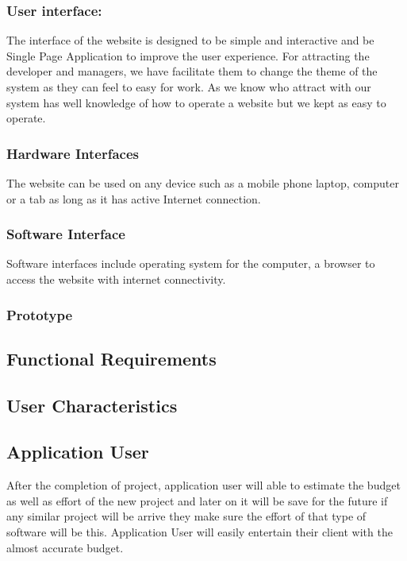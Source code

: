     \subsubsection{User interface: }
    The interface of the website is designed to be simple and interactive and be Single Page Application to improve the user experience. 
    For attracting the developer and managers, we have facilitate them to change the theme of the system as they can feel to easy for work.
    As we know who attract with our system has well knowledge of how to operate a website but we kept as easy to operate.
    \subsubsection{Hardware Interfaces}
    The website can be used on any device such as a mobile phone laptop, computer or a tab as long as it has active Internet connection.
    \subsubsection{Software Interface}
    Software interfaces include operating system for the computer, a browser to access the website with internet connectivity.
    \subsubsection{Prototype}
    
    
    \pagebreak
    \subsection{Functional Requirements}
    

    
    \pagebreak

    


\subsection{User Characteristics}
\subsection*{Application User}
After the completion of project, application user will able to estimate the budget as well as effort of the new project and later on it will be save for the future if any similar project will be arrive they make sure the effort of that type of software will be this.
Application User will easily entertain their client with the almost accurate budget. 

